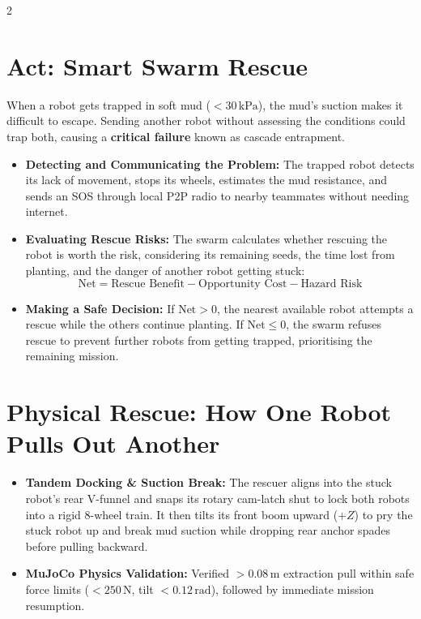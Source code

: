 \documentclass[9pt,a4paper]{article}
\begin{document}
\begin{multicols}{2}
\section{\textbf{Act: Smart Swarm Rescue}}
When a robot gets trapped in soft mud ($<30\,\text{kPa}$), the mud's suction makes it difficult to escape. Sending another robot without assessing the conditions could trap both, causing a \textbf{critical failure} known as cascade entrapment.
\begin{itemize}
    \item \textbf{Detecting and Communicating the Problem:} The trapped robot detects its lack of movement, stops its wheels, estimates the mud resistance, and sends an SOS through local P2P radio to nearby teammates without needing internet.
    \item \textbf{Evaluating Rescue Risks:} The swarm calculates whether rescuing the robot is worth the risk, considering its remaining seeds, the time lost from planting, and the danger of another robot getting stuck:
    $$\text{Net} = \text{Rescue Benefit} - \text{Opportunity Cost} - \text{Hazard Risk}$$
    \item \textbf{Making a Safe Decision:} If $\text{Net} > 0$, the nearest available robot attempts a rescue while the others continue planting. If $\text{Net} \le 0$, the swarm refuses rescue to prevent further robots from getting trapped, prioritising the remaining mission.
\end{itemize}

\section{\textbf{Physical Rescue: How One Robot Pulls Out Another}}
\begin{itemize}
    \item \textbf{Tandem Docking \& Suction Break:} The rescuer aligns into the stuck robot's rear V-funnel and snaps its rotary cam-latch shut to lock both robots into a rigid 8-wheel train. It then tilts its front boom upward ($+Z$) to pry the stuck robot up and break mud suction while dropping rear anchor spades before pulling backward.
    \item \textbf{MuJoCo Physics Validation:} Verified $>0.08\,\text{m}$ extraction pull within safe force limits ($<250\,\text{N}$, tilt $<0.12\,\text{rad}$), followed by immediate mission resumption.
\end{itemize}


\end{multicols}
\end{document}
